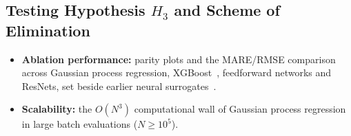 \subsection{Testing Hypothesis \texorpdfstring{$H_3$}{H3} and Scheme of Elimination}
\label{sec:h3}

\begin{itemize}
  \item \textbf{Ablation performance:} parity plots and the MARE/RMSE comparison across Gaussian process regression, XGBoost~\citep{TODO_XGBoost}, feedforward networks and ResNets, set beside earlier neural surrogates~\citep{Liodis2024,Kaushikk2026,Liu2026}.
  \item \textbf{Scalability:} the $O(N^3)$ computational wall of Gaussian process regression~\citep{Rasmussen2005_GP} in large batch evaluations ($N \ge 10^5$).
\end{itemize}
